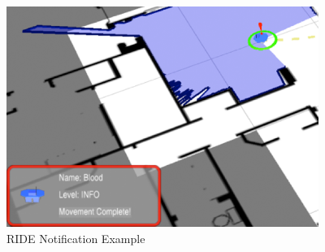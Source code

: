 \begin{figure}[ht]
\begin{center}
\includegraphics[width=4in]{images/ride-notification.png}
\caption{RIDE Notification Example\label{fig:ride-notification}}
\end{center}
\end{figure}

% 
% 
% 
% 


